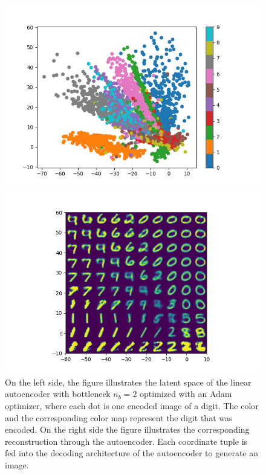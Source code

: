 \begin{figure}
\begin{center}
   \begin{minipage}[b]{0.49\linewidth}
      \includegraphics[trim = 15mm 5mm 15mm 10mm, clip, width=\linewidth]{linear_AE_2d_adam_latent}
	\end{minipage}
   \begin{minipage}[b]{0.49\linewidth}
      \includegraphics[trim = 15mm 5mm 15mm 15mm, clip, width=\linewidth]{linear_AE_2d_adam_reconstruction}
	\end{minipage}
\end{center}
\caption{On the left side, the figure illustrates the latent space of the linear autoencoder with bottleneck $n_b=2$ optimized with an Adam optimizer, where each dot is one encoded image of a digit. The color and the corresponding color map represent the digit that was encoded. On the right side the figure illustrates the corresponding reconstruction through the autoencoder. Each coordinate tuple is fed into the decoding architecture of the autoencoder to generate an image.}\label{fig:linear_AE_2d_adam_latent}
\end{figure}


